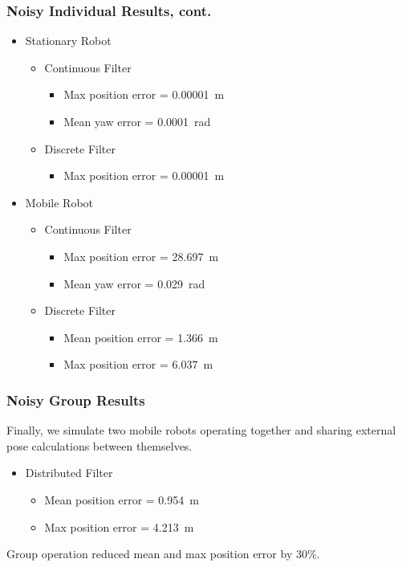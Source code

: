 \documentclass[14pt]{beamer}
\begin{document}
\begin{frame}
\frametitle{Noisy Individual Results, cont.}
\begin{itemize}
\item Stationary Robot
    \begin{itemize}
    \item Continuous Filter
        \begin{itemize}
        \item Max position error = \SI{.00001}{\meter}
        \item Mean yaw error = \SI{.0001}{\radian}
        \end{itemize}
    \item Discrete Filter
        \begin{itemize}
        \item Max position error = \SI{.00001}{\meter}
        \end{itemize}
    \end{itemize}
\item Mobile Robot
    \begin{itemize}
    \item Continuous Filter
        \begin{itemize}
        \item Max position error = \SI{28.697}{\meter}
        \item Mean yaw error = \SI{.029}{\radian}
        \end{itemize}
    \item Discrete Filter
        \begin{itemize}
        \item Mean position error = \SI{1.366}{\meter}
        \item Max position error = \SI{6.037}{\meter}
        \end{itemize}
    \end{itemize}
\end{itemize}
\end{frame}

\begin{frame}
\frametitle{Noisy Group Results}
Finally, we simulate two mobile robots operating together and sharing external pose calculations between themselves.

\vspace{14pt}
\begin{itemize}
\item Distributed Filter
    \begin{itemize}
    \item Mean position error = \SI{.954}{\meter}
    \item Max position error = \SI{4.213}{\meter}
    \end{itemize}
\end{itemize}

Group operation reduced mean and max position error by 30\%.
\end{frame}
\end{document}
